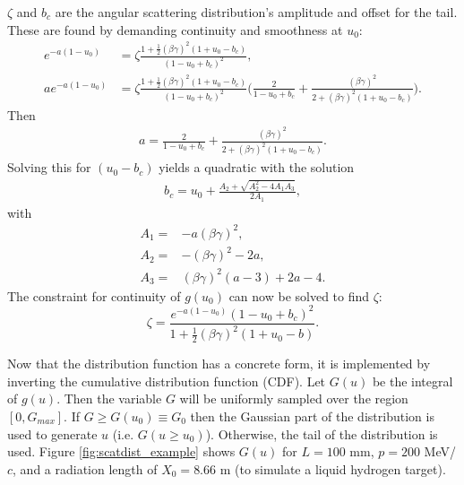$\zeta$ and $b_c$ are the angular scattering distribution's amplitude and offset for the tail. These are found by demanding continuity and smoothness at $u_0$:
\begin{align*}
e^{-a(1-u_0)}&=\zeta\frac{1+\frac{1}{2}(\beta\gamma)^2(1+u_0-b_c)}{(1-u_0+b_c)^2},\\
ae^{-a(1-u_0)}&=\zeta\frac{1+\frac{1}{2}(\beta\gamma)^2(1+u_0-b_c)}{(1-u_0+b_c)^2} \Big(\frac{2}{1-u_0+b_c}+\frac{(\beta\gamma)^2}{2+(\beta\gamma)^2(1+u_0-b_c)}\Big).
\end{align*}
Then
\begin{align*}
a=\frac{2}{1-u_0+b_c}+\frac{(\beta\gamma)^2}{2+(\beta\gamma)^2(1+u_0-b_c)}.
\end{align*}
Solving this for $(u_0-b_c)$ yields a quadratic with the solution
\begin{align} \label{eqn:cosybc}
b_c=u_0+\frac{A_2 + \sqrt{A_2 ^2 - 4A_1 A_3}}{2A_1},
\end{align}
with
\begin{align*}
A_1=&-a(\beta\gamma)^2,\\
A_2=&-(\beta\gamma)^2-2a,\\
A_3=&(\beta\gamma)^2(a-3)+2a-4.
\end{align*}
The constraint for continuity of $g(u_0)$ can now be solved to find $\zeta$:
\begin{equation}\label{eqn:cosyzeta}
\zeta=\frac{e^{-a(1-u_0)}(1-u_0+b_c)^2}{1+\frac{1}{2}(\beta\gamma)^2(1+u_0-b)}.
\end{equation}

Now that the distribution function has a concrete form, it is implemented by inverting the cumulative distribution function (CDF).  Let $G(u)$ be the integral of $g(u)$. Then the variable $G$ will be uniformly sampled over the region $[0,G_{max}]$. If $G\geq G(u_0) \equiv G_0$ then the Gaussian part of the distribution is used to generate $u$ (i.e. $G(u\geq u_0)$). Otherwise, the tail of the distribution is used. Figure \ref{fig:scatdist_example} shows $G(u)$ for $L=100$ mm, $p=200$ MeV/$c$, and a radiation length of $X_0 = 8.66$ m (to simulate a liquid hydrogen target).

